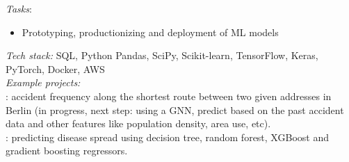 \documentclass[
	a4paper,
]{fortysecondscv}
\begin{document}
\begin{cvtable}[1.0]

	{\href{https://datascienceretreat.com}{\color{pblue}{Data Science Retreat, Germany}}}
	{\textit{Tasks}: 
    \begin{itemize}[topsep=0pt,itemsep=0pt,partopsep=0pt, parsep=0pt, leftmargin=*]
     \setlength\itemsep{1mm}
     \item Prototyping, productionizing and deployment of ML models
    \end{itemize}
    \textit{Tech stack:} SQL, Python Pandas, SciPy, Scikit-learn, TensorFlow, Keras, PyTorch, Docker, AWS\\
    \textit{Example projects:}\\
    \href{https://onurkerimoglu-accindex-main-n021i3.streamlit.app/}{\color{pblue}{AccIndex (Demo)}}: accident frequency along the shortest route between two given addresses in Berlin (in progress, next step: using a GNN, predict based on the past accident data and other features like population density, area use, etc).\\
    \href{https://github.com/OnurKerimoglu/Dengue}{\color{pblue}{Dengue}}: predicting disease spread using decision tree, random forest, XGBoost and gradient boosting regressors.
    }
    

\end{cvtable}
\end{document}
